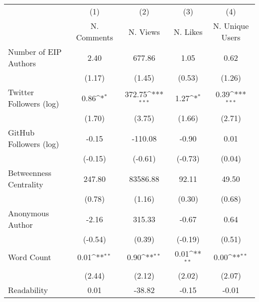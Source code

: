 {
\def\sym#1{\ifmmode^{#1}\else\(^{#1}\)\fi}
\begin{tabular}{l*{4}{c}}
\hline\hline
                                   &\multicolumn{1}{c}{(1)}&\multicolumn{1}{c}{(2)}&\multicolumn{1}{c}{(3)}&\multicolumn{1}{c}{(4)}\\
                                   &\multicolumn{1}{c}{N. Comments}&\multicolumn{1}{c}{N. Views}&\multicolumn{1}{c}{N. Likes}&\multicolumn{1}{c}{N. Unique Users}\\
\hline
Number of EIP Authors              &        2.40         &      677.86         &        1.05         &        0.62         \\
                                   &      (1.17)         &      (1.45)         &      (0.53)         &      (1.26)         \\
[1em]
Twitter Followers (log)            &        0.86\sym{*}  &      372.75\sym{***}&        1.27\sym{*}  &        0.39\sym{***}\\
                                   &      (1.70)         &      (3.75)         &      (1.66)         &      (2.71)         \\
[1em]
GitHub Followers (log)             &       -0.15         &     -110.08         &       -0.90         &        0.01         \\
                                   &     (-0.15)         &     (-0.61)         &     (-0.73)         &      (0.04)         \\
[1em]
Betweenness Centrality             &      247.80         &    83586.88         &       92.11         &       49.50         \\
                                   &      (0.78)         &      (1.16)         &      (0.30)         &      (0.68)         \\
[1em]
Anonymous Author                   &       -2.16         &      315.33         &       -0.67         &        0.64         \\
                                   &     (-0.54)         &      (0.39)         &     (-0.19)         &      (0.51)         \\
[1em]
Word Count                         &        0.01\sym{**} &        0.90\sym{**} &        0.01\sym{**} &        0.00\sym{**} \\
                                   &      (2.44)         &      (2.12)         &      (2.02)         &      (2.07)         \\
[1em]
Readability                        &        0.01         &      -38.82         &       -0.15         &       -0.01         \\

\end{tabular}}
